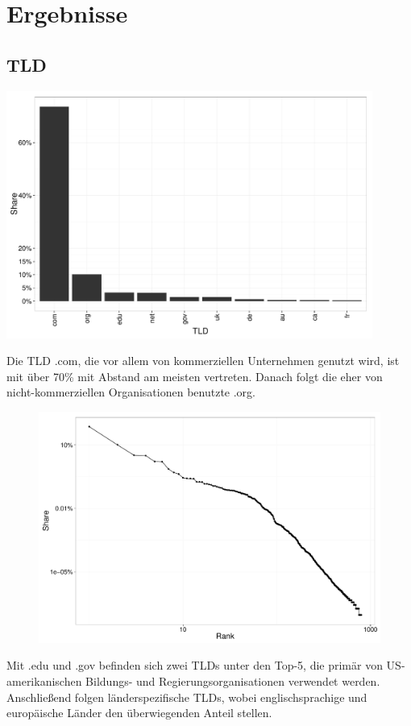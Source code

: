 \documentclass[a4paper,12pt,titlepage=false]{scrreprt}
\begin{document}
\chapter{Ergebnisse}


\section{TLD}

\begin{center}
    \includegraphics[width=0.9\textwidth]{plots/plot_tld_top10}
\end{center}

\noindent
Die TLD .com, die vor allem von kommerziellen Unternehmen genutzt wird, ist mit über 70\% mit Abstand am meisten vertreten. Danach folgt die eher von nicht-kommerziellen Organisationen benutzte .org.

\begin{figure}
    \label{wrap-fig:2}
    \includegraphics[width=.63\textwidth]{plots/plot_tld_zipf}
\end{figure}

Mit .edu und .gov befinden sich zwei TLDs unter den Top-5, die primär von US-amerikanischen Bildungs- und Regierungsorganisationen verwendet werden. Anschließend folgen länderspezifische TLDs, wobei englischsprachige und europäische Länder den überwiegenden Anteil stellen.
\end{document}

